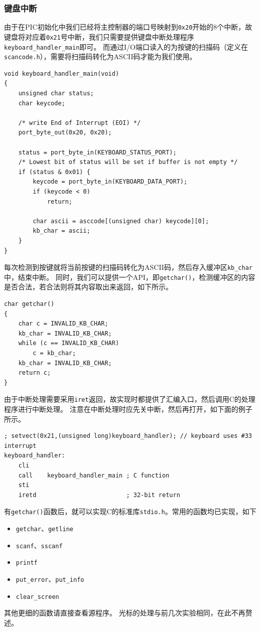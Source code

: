\documentclass[logo,reportComp]{thesis}
\begin{document}
\subsubsection{键盘中断}
由于在PIC初始化中我们已经将主控制器的端口号映射到\verb'0x20'开始的8个中断，故键盘将对应着\verb'0x21'号中断，我们只需要提供键盘中断处理程序\verb'keyboard_handler_main'即可。
而通过I/O端口读入的为按键的扫描码（定义在\verb'scancode.h'），需要将扫描码转化为ASCII码才能为我们使用。
\begin{lstlisting}
void keyboard_handler_main(void)
{
	unsigned char status;
	char keycode;

	/* write End of Interrupt (EOI) */
	port_byte_out(0x20, 0x20);

	status = port_byte_in(KEYBOARD_STATUS_PORT);
	/* Lowest bit of status will be set if buffer is not empty */
	if (status & 0x01) {
		keycode = port_byte_in(KEYBOARD_DATA_PORT);
		if (keycode < 0)
			return;

		char ascii = asccode[(unsigned char) keycode][0];
		kb_char = ascii;
	}
}
\end{lstlisting}

每次检测到按键就将当前按键的扫描码转化为ASCII码，然后存入缓冲区\verb'kb_char'中，结束中断。
同时，我们可以提供一个API，即\verb'getchar()'，检测缓冲区的内容是否合法，若合法则将其内容取出来返回，如下所示。
\begin{lstlisting}
char getchar()
{
	char c = INVALID_KB_CHAR;
	kb_char = INVALID_KB_CHAR;
	while (c == INVALID_KB_CHAR)
		c = kb_char;
	kb_char = INVALID_KB_CHAR;
	return c;
}
\end{lstlisting}

由于中断处理需要采用\verb'iret'返回，故实现时都提供了汇编入口，然后调用C的处理程序进行中断处理。
注意在中断处理时应先关中断，然后再打开，如下面的例子所示。
\begin{lstlisting}[language={[x86masm]Assembler}]
; setvect(0x21,(unsigned long)keyboard_handler); // keyboard uses #33 interrupt
keyboard_handler:
	cli
	call    keyboard_handler_main ; C function
	sti
	iretd                         ; 32-bit return
\end{lstlisting}

有\verb'getchar()'函数后，就可以实现C的标准库\verb'stdio.h'。常用的函数均已实现，如下
\begin{itemize}
	\item \verb'getchar'、\verb'getline'
	\item \verb'scanf'、\verb'sscanf'
	\item \verb'printf'
	\item \verb'put_error'、\verb'put_info'
	\item \verb'clear_screen'
\end{itemize}
其他更细的函数请直接查看源程序。
光标的处理与前几次实验相同，在此不再赘述。
\end{document}
